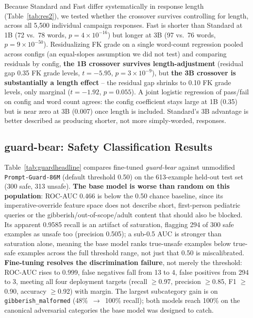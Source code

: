 \documentclass[pdflatex,sn-mathphys-num]{sn-jnl}%
\begin{document}
Because Standard and Fast differ systematically in response length (Table~\ref{tab:res2}), we tested whether the crossover survives controlling for length, across all 5{,}500 individual campaign responses. Fast is shorter than Standard at 1B (72 vs.\ 78 words, $p=4\times10^{-16}$) but longer at 3B (97 vs.\ 76 words, $p=9\times10^{-50}$). Residualizing FK grade on a single word-count regression pooled across configs (an equal-slopes assumption we did not test) and comparing residuals by config, \textbf{the 1B crossover survives length-adjustment} (residual gap 0.35 FK grade levels, $t=-5.95$, $p=3\times10^{-9}$), but \textbf{the 3B crossover is substantially a length effect} -- the residual gap shrinks to 0.10 FK grade levels, only marginal ($t=-1.92$, $p=0.055$). A joint logistic regression of pass/fail on config and word count agrees: the config coefficient stays large at 1B (0.35) but is near zero at 3B (0.007) once length is included. Standard's 3B advantage is better described as producing shorter, not more simply-worded, responses.

\subsection{guard-bear: Safety Classification Results}\label{sec:guardresults}

Table~\ref{tab:guardheadline} compares fine-tuned \textit{guard-bear} against unmodified \texttt{Prompt-Guard-86M} (default threshold 0.50) on the 613-example held-out test set (300 safe, 313 unsafe). \textbf{The base model is worse than random on this population}: ROC-AUC 0.466 is below the 0.50 chance baseline, since its imperative-override feature space does not describe short, first-person pediatric queries or the gibberish/out-of-scope/adult content that should also be blocked. Its apparent 0.9585 recall is an artifact of saturation, flagging 294 of 300 safe examples as unsafe too (precision 0.505); a sub-0.5 AUC is stronger than saturation alone, meaning the base model ranks true-unsafe examples below true-safe examples across the full threshold range, not just that 0.50 is miscalibrated. \textbf{Fine-tuning resolves the discrimination failure}, not merely the threshold: ROC-AUC rises to 0.999, false negatives fall from 13 to 4, false positives from 294 to 3, meeting all four deployment targets (recall $\geq$0.97, precision $\geq$0.85, F1 $\geq$0.90, accuracy $\geq$0.92) with margin. The largest subcategory gain is on \texttt{gibberish\_malformed} (48\%~$\to$~100\% recall); both models reach 100\% on the canonical adversarial categories the base model was designed to catch.
\end{document}
